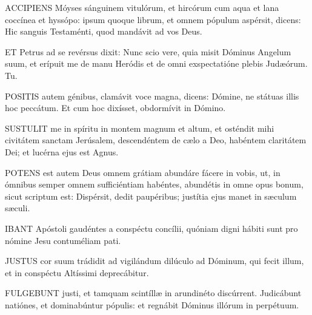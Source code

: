 
\lettrine[lines=2]{A}{CCIPIENS} Móyses sánguinem vitulórum, et hircórum cum aqua et lana coccínea et hyssópo: ipsum quoque librum, et omnem pópulum aspérsit, dicens: Hic sanguis Testaménti, quod mandávit ad vos Deus.


\lettrine[lines=2]{E}{T} Petrus ad se revérsus dixit: Nunc scio vere, quia misit Dóminus Angelum suum, et erípuit me de manu Heródis et de omni exspectatióne plebis Judæórum. Tu.



\lettrine[lines=2]{P}{OSITIS} autem génibus, clamávit voce magna, dicens: Dómine, ne státuas illis hoc peccátum. Et cum hoc dixísset, obdormívit in Dómino.


\lettrine[lines=2]{S}{USTULIT} me in spíritu in montem magnum et altum, et osténdit mihi civitátem sanctam Jerúsalem, descendéntem de cælo a Deo, habéntem claritátem Dei; et lucérna ejus est Agnus.


\lettrine[lines=2]{P}{OTENS} est autem Deus omnem grátiam abundáre fácere in vobis, ut, in ómnibus semper omnem sufficiéntiam habéntes, abundétis in omne opus bonum, sicut scriptum est: Dispérsit, dedit paupéribus; justítia ejus manet in sæculum sæculi.



\lettrine[lines=2]{I}{BANT} Apóstoli gaudéntes a conspéctu concílii, quóniam digni hábiti sunt pro nómine Jesu contuméliam pati.


\lettrine[lines=2]{J}{USTUS} cor suum trádidit ad vigilándum dilúculo ad Dóminum, qui fecit illum, et in conspéctu Altíssimi deprecábitur.


\lettrine[lines=2]{F}{ULGEBUNT} justi, et tamquam scintíllæ in arundinéto discúrrent. Judicábunt natiónes, et dominabúntur pópulis: et regnábit Dóminus illórum in perpétuum.


